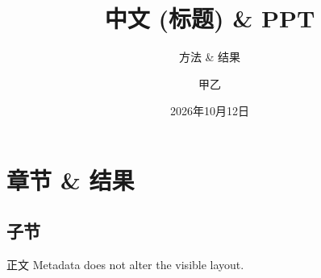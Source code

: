 \documentclass[language=chinese]{campusbeamer}
\title{中文 (标题) \& PPT}
\subtitle{方法 \& 结果}
\author{甲乙}
\date{2026年10月12日}
\begin{document}
\maketitle
\section{章节 \& 结果}
\subsection{子节}
\begin{frame}{正文}
  Metadata does not alter the visible layout.
\end{frame}
\end{document}
